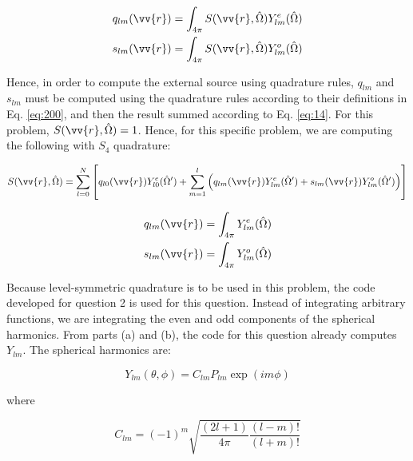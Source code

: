 \documentclass[10pt]{article}
\begin{document}
\begin{equation}
\label{eq:200}
\begin{aligned}
q_{lm}(\vv{r})=\int_{4\pi}^{}S(\vv{r},\hat{\Omega})Y_{lm}^e(\hat{\Omega})\\
s_{lm}(\vv{r})=\int_{4\pi}^{}S(\vv{r},\hat{\Omega})Y_{lm}^o(\hat{\Omega})\\
\end{aligned}
\end{equation}

Hence, in order to compute the external source using quadrature rules, \(q_{lm}\) and \(s_{lm}\) must be computed using the quadrature rules according to their definitions in Eq. \eqref{eq:200}, and then the result summed according to Eq. \eqref{eq:14}. For this problem, \(S(\vv{r},\hat{\Omega})=1\). Hence, for this specific problem, we are computing the following with \(S_4\) quadrature:

\begin{equation}
\label{eq:141}
S(\vv{r},\hat{\Omega})=\sum_{l=0}^{N}\left\lbrack q_{l0}(\vv{r})Y_{l0}^e(\hat{\Omega}')+\sum_{m=1}^{l}\left(q_{lm}(\vv{r})Y_{lm}^{e}(\hat{\Omega}')+s_{lm}(\vv{r})Y_{lm}^{o}(\hat{\Omega}')\right)\right\rbrack
\end{equation}

\begin{equation}
\label{eq:2001}
\begin{aligned}
q_{lm}(\vv{r})=\int_{4\pi}^{}Y_{lm}^e(\hat{\Omega})\\
s_{lm}(\vv{r})=\int_{4\pi}^{}Y_{lm}^o(\hat{\Omega})\\
\end{aligned}
\end{equation}

Because level-symmetric quadrature is to be used in this problem, the code developed for question 2 is used for this question. Instead of integrating arbitrary functions, we are integrating the even and odd components of the spherical harmonics. From parts (a) and (b), the code for this question already computes \(Y_{lm}\). The spherical harmonics are:

\begin{equation}
\label{eq:SphericaltoAssociatedShort}
Y_{lm}(\theta,\phi)=C_{lm}P_{lm}\exp{(im\phi)}
\end{equation}

where

\begin{equation}
\label{eq:Clm}
C_{lm}=(-1)^m\sqrt{\frac{(2l+1)}{4\pi}\frac{(l-m)!}{(l+m)!}}
\end{equation}
\end{document}
